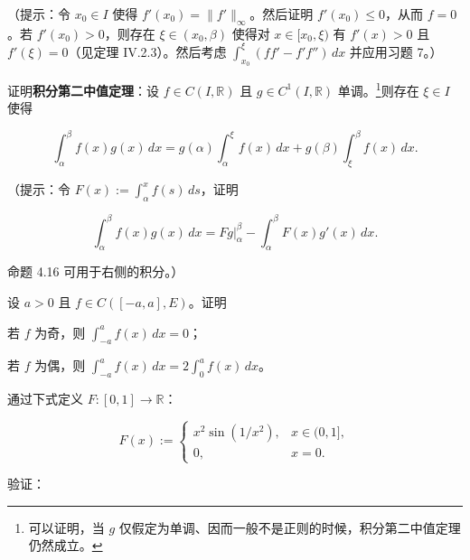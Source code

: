 \begin{exercises}
（提示：令 $ x_0 \in I $ 使得 $ f'(x_0) = \|f'\|_\infty $。然后证明 $ f'(x_0) \le 0 $，从而 $ f = 0 $。若 $ f'(x_0) > 0 $，则存在 $ \xi \in (x_0, \beta) $ 使得对 $ x \in [x_0, \xi) $ 有 $ f'(x) > 0 $ 且 $ f'(\xi) = 0 $（见定理 IV.2.3）。然后考虑 $ \int_{x_0}^{\xi} (f f' - f' f'') \, dx $ 并应用习题 7。）

\item

证明\textbf{积分第二中值定理}：设 $ f \in C(I, \mathbb{R}) $ 且 $ g \in C^1(I, \mathbb{R}) $ 单调。\footnote{可以证明，当 $ g $ 仅假定为单调、因而一般不是正则的时候，积分第二中值定理仍然成立。}则存在 $ \xi \in I $ 使得

\[
\int_{\alpha}^{\beta} f(x) g(x) \, dx = g(\alpha) \int_{\alpha}^{\xi} f(x) \, dx + g(\beta) \int_{\xi}^{\beta} f(x) \, dx .
\]

（提示：令 $ F(x) := \int_{\alpha}^{x} f(s) \, ds $，证明

\[
\int_{\alpha}^{\beta} f(x) g(x) \, dx = F g \big|_{\alpha}^{\beta} - \int_{\alpha}^{\beta} F(x) g'(x) \, dx .
\]

命题 4.16 可用于右侧的积分。）

\item

设 $ a > 0 $ 且 $ f \in C([-a, a], E) $。证明

\begin{subitems}
\item

若 $ f $ 为奇，则 $ \int_{-a}^{a} f(x) \, dx = 0 $；

\item

若 $ f $ 为偶，则 $ \int_{-a}^{a} f(x) \, dx = 2 \int_{0}^{a} f(x) \, dx $。

\end{subitems}

\item

通过下式定义 $ F : [0, 1] \to \mathbb{R} $：

\begin{equation*}
F(x) := \begin{cases} x^2 \sin(1/x^2) , & x \in (0, 1] , \\ 0 , & x = 0 . \end{cases}
\end{equation*}

验证：

\begin{subitems}
\item


\end{subitems}
\end{exercises}
